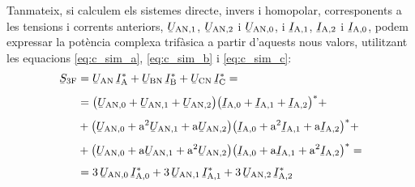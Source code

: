 Tanmateix, si calculem els sistemes directe, invers i homopolar,
corresponents a les tensions i corrents anteriors,
$\cmplx{U}\ped{AN,1}$, $\cmplx{U}\ped{AN,2}$ i
$\cmplx{U}\ped{AN,0}$, i $\cmplx{I}\ped{A,1}$,
$\cmplx{I}\ped{A,2}$ i $\cmplx{I}\ped{A,0}$, podem
expressar la potència complexa trifàsica a partir d'aquests nous
valors, utilitzant les equacions \eqref{eq:c_sim_a},
\eqref{eq:c_sim_b} i \eqref{eq:c_sim_c}:
\begin{equation}
\begin{split}
   \cmplx{S}\ped{3F} &= \cmplx{U}\ped{AN} \,\cmplx{I}\ped{A}^* +
   \cmplx{U}\ped{BN} \,\cmplx{I}\ped{B}^* +  \cmplx{U}\ped{CN} \,\cmplx{I}\ped{C}^* = \\[1ex]
   &= \big(\cmplx{U}\ped{AN,0} + \cmplx{U}\ped{AN,1} +
   \cmplx{U}\ped{AN,2}\big) \big(\cmplx{I}\ped{A,0} + \cmplx{I}\ped{A,1} +
   \cmplx{I}\ped{A,2}\big)^* +  \\[1ex]
   &+ \big(\cmplx{U}\ped{AN,0} + \au^2 \cmplx{U}\ped{AN,1} +
   \au \cmplx{U}\ped{AN,2} \big) \big(\cmplx{I}\ped{A,0} + \au^2 \cmplx{I}\ped{A,1}
    + \au \cmplx{I}\ped{A,2} \big)^* + \\[1ex]
   &+ \big(\cmplx{U}\ped{AN,0} + \au \cmplx{U}\ped{AN,1} + \au^2
   \cmplx{U}\ped{AN,2} \big) \big(\cmplx{I}\ped{A,0} + \au
   \cmplx{I}\ped{A,1} + \au^2 \cmplx{I}\ped{A,2} \big)^* =  \\[1ex]
   &= 3\, \cmplx{U}\ped{AN,0} \, \cmplx{I}\ped{A,0}^* +
      3\, \cmplx{U}\ped{AN,1} \, \cmplx{I}\ped{A,1}^* +
      3\, \cmplx{U}\ped{AN,2}\,  \cmplx{I}\ped{A,2}^*
    \label{eq:c_sim_s}
\end{split}
\end{equation}



